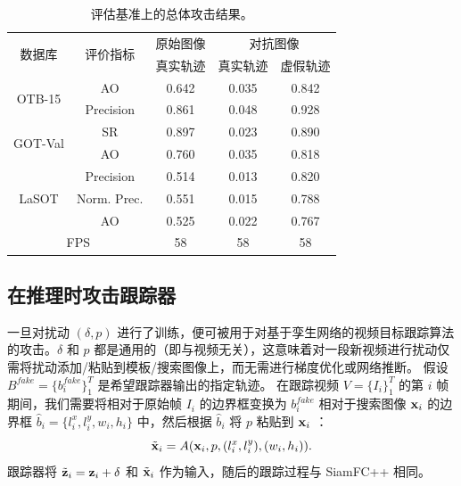 \begin{table}[t]
\centering
\caption{评估基准上的总体攻击结果。}
\begin{tabular}{c c c c c}
\toprule
\multirow{2}{*}[-2pt]{数据库} & \multirow{2}{*}[-2pt]{评价指标} & 原始图像 & \multicolumn{2}{c}{对抗图像}  \\
\cmidrule(lr){3-3} \cmidrule(lr){4-5}
                          &                         & 真实轨迹 & 真实轨迹 & 虚假轨迹     \\ 
\midrule
\multirow{2}{*}{OTB-15} 
& AO   & 0.642 & 0.035 & 0.842\\
& Precision & 0.861 & 0.048 & 0.928\\
\midrule
\multirow{2}{*}{GOT-Val} 
& SR & 0.897 & 0.023 & 0.890\\
& AO 				   & 0.760 & 0.035 & 0.818 \\
\midrule
\multirow{3}{*}{LaSOT} 
& Precision       & 0.514 & 0.013 & 0.820\\
& Norm. Prec. & 0.551 & 0.015 & 0.788\\
& AO & 0.525 & 0.022 & 0.767\\
\midrule
\multicolumn{2}{c}{FPS} & 58 & 58 & 58\\
\bottomrule
\end{tabular}
\label{tab:attack_benchmark results}
\end{table}

\subsection{在推理时攻击跟踪器}

一旦对扰动 $(\delta, p)$ 进行了训练，便可被用于对基于孪生网络的视频目标跟踪算法的攻击。$\delta$ 和 $p$ 都是通用的（即与视频无关），这意味着对一段新视频进行扰动仅需将扰动添加/粘贴到模板/搜索图像上，而无需进行梯度优化或网络推断。
假设 $B^{fake}=\{b^{fake}_i\}_1^{T}$ 是希望跟踪器输出的指定轨迹。
在跟踪视频 $V=\{I_i\}_1^T$ 的第 $i$ 帧期间，我们需要将相对于原始帧 $I_i$ 的边界框变换为 $b^{fake}_i$ 相对于搜索图像 $\textbf x_i$ 的边界框 $\hat b_i=\{l^x_i, l^y_i, w_i, h_i\}$ 中，然后根据 $\hat b_i$ 将 $p$ 粘贴到 $\textbf x_i$ ：
\begin{equation}
\tilde{\textbf x}_i = A(\textbf x_i, p, (l^x_i, l^y_i), (w_i, h_i)).
\end{equation}
跟踪器将 $\tilde{\textbf z}_i=\textbf z_i+\delta$ 和 $\tilde{\textbf x}_i$ 作为输入，随后的跟踪过程与 SiamFC++ 相同。

